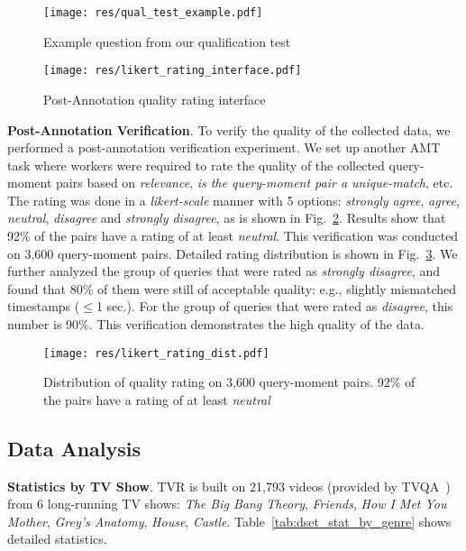\documentclass[runningheads]{llncs}
\begin{document}
\begin{figure}[!ht]
  \centering
  \texttt{[image: res/qual\_test\_example.pdf]}
  \caption{Example question from our qualification test}
  \label{fig:qual_test_example}
\end{figure}


\begin{figure}[!t]
  \centering
  \texttt{[image: res/likert\_rating\_interface.pdf]}
  \caption{Post-Annotation quality rating interface}
  \label{fig:likert_scale_interface}
\end{figure}


\kern2mm
\noindent\textbf{Post-Annotation Verification}. 
To verify the quality of the collected data, we performed a post-annotation verification experiment. 
We set up another AMT task where workers were required to rate the quality of the collected query-moment pairs based on \textit{relevance}, \textit{is the query-moment pair a unique-match}, etc. 
The rating was done in a \textit{likert-scale} manner with 5 options: \textit{strongly agree}, \textit{agree}, \textit{neutral}, \textit{disagree} and \textit{strongly disagree}, as is shown in Fig.~\ref{fig:likert_scale_interface}.
Results show that 92\% of the pairs have a rating of at least \textit{neutral}. This verification was conducted on 3,600 query-moment pairs. Detailed rating distribution is shown in Fig.~\ref{fig:likert_rating_dist}. We further analyzed the group of queries that were rated as \textit{strongly disagree}, and found that 80\% of them were still of acceptable quality: e.g., slightly mismatched timestamps ($\leq$1 sec.). For the group of queries that were rated as \textit{disagree}, this number is 90\%. This verification demonstrates the high quality of the data.


\begin{figure}[!t]
  \centering
  \texttt{[image: res/likert\_rating\_dist.pdf]}
  \caption{Distribution of quality rating on 3,600 query-moment pairs. 92\% of the pairs have a rating of at least \textit{neutral}
  }
  \label{fig:likert_rating_dist}
\end{figure}



\subsection{Data Analysis}\label{subsec:supp_data_analysis}
\noindent\textbf{Statistics by TV Show}. TVR is built on 21,793 videos (provided by TVQA~\cite{Lei2018TVQALC}) from 6 long-running TV shows: \textit{The Big Bang Theory}, \textit{Friends}, \textit{How I Met You Mother}, \textit{Grey's Anatomy}, \textit{House}, \textit{Castle}. Table~\ref{tab:dset_stat_by_genre} shows detailed statistics. 
\end{document}
